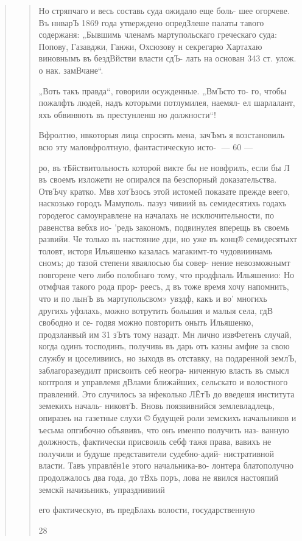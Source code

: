 \begin{quote}
\begin{quote}
Но стряпчаго и весь составь суда ожидало еще боль-
шее огорчеве. Въ ннварЪ 1869 года утверждено опредЗлеше
палаты тавого содержаня: „Бывшимь членамъ мартупольскаго
греческаго суда: Попову, Газавджи, Ганжи, Охсюзову н
секрегарю Хартахаю виновнымъ въ бездВйстви власти сдЪ-
лать на основан 343 ст. улож. о нак. замВчане“.

„Воть такъ правда“, говорили осужденные. „ВмЪсто то-
го, чтобы пожалфть людей, надъ которыми потлумилея, наемял-
ел шарлалант, яхъ обвиняють въ престунленш но должности“!

Вфролтно, нвкоторыя лица спросять мена, зачЪмъ я
возстановиль всю эту маловфролтную, фантастическую исто-
— 60 —

ро, въ тБйствитольность которой викте бы не новфрилъ,
если бы Л въ своемъ изложети не опирался па безспорный
доказательства. ОтвЪчу кратко. Мвв хотЪзось этой истомей
показате прежде веего, наскозько городъ Мамуполь. пазуз
чивиий въ семидесятихь годахъ городегос самоунравлене
на началахь не исключительности, по равенства вебхв ио-
’редь закономъ, подвинулея вперещь въ своемь развийи. Че
только въ настояние дци, но уже въ конц® семидесятыхт
толовт, исторя Ильяшенко казалась ма гакимт-то
чудовииинамь сномъ; до тазой степени яваялосью бы совер-
нение невозможнымт повгорене чего либо полобнаго тому,
что продфлаль Ильяшенио: Но отмфчая такого рода прор-
реесъ, д въ тоже время хочу напомнить, что и по лынЪ въ
мартупольсвом» увздф, какъ и во’ многихь другихь уфзлахь,
можно вотрутить большия и малыя села, гдВ свободно и се-
годвя можно повторить оныть Ильяшенко, продзланвый им
31 зЪтъ тому назадт. Мн лично извФетенъ случай, когда
одинъ тосподинъ, получивь въ дарь отъ казны амфие за
свою службу и цоселивиись, но зыходв въ отставку, на
подаренной землЪ, заблагоразеудилт присвоить себ неогра-
ниченную власть въ смысл коптроля и управлемя дВлами
ближайших, сельскато и волостного правлений. Это случилось
за нфеколько ЛЁтЪ до введешя института земекихъ началь-
никовтЪ. Вновь поязвивнийся землевладлець, опиразеь на
газетные слухи © будущей роли земскихъ начальников и
ъесьма опгибочно объявивъ, что онъ именпо получить наз-
ванную должность, фактически присвоиль себф тажя права,
вавихъ не получили и будуше представители судебно-адий-
нистративной власти. Тавъ управлён1е этого начальника-во-
лонтера блатополучно продолжалось два года, до тВхь поръ,
лова не явился настояпий земскй начизьникъ, упразднивиий

его фактическую, въ предБлахь волости, государственную

28


\end{quote}
\end{quote}
